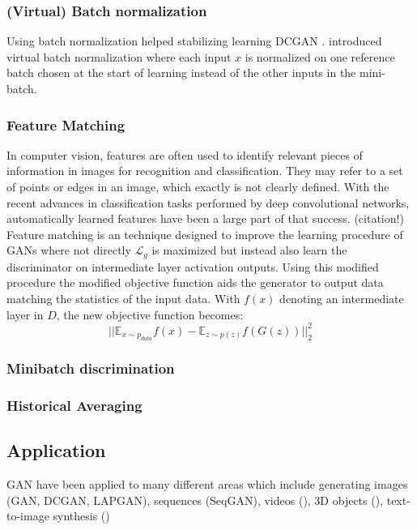 \subsubsection{(Virtual) Batch normalization}
\label{ssub:gan_batch_norm}
Using batch normalization \cite{batch_norm:2015} helped stabilizing learning DCGAN \cite{dcgan:2015}.
\cite{improved_gan:2016} introduced virtual batch normalization where each input $x$ is normalized on one reference batch chosen at the start of learning instead of the other inputs in the mini-batch.

\subsubsection{Feature Matching}
\label{ssub:gan_feature_matching}
In computer vision, features are often used to identify relevant pieces of information in images for recognition and classification.
They may refer to a set of points or edges in an image, which exactly is not clearly defined.
With the recent advances in classification tasks performed by deep convolutional networks, automatically learned features have been a large part of that success. (citation!)
Feature matching is an technique designed to improve the learning procedure of GANs where not directly $\mathcal{L}_g$ is maximized but instead also learn the discriminator on intermediate layer activation outputs.
Using this modified procedure the modified objective function aids the generator to output data matching the statistics of the input data.
With $f(x)$ denoting an intermediate layer in $D$, the new objective function becomes:
$$
|| \mathbb{E}_{x \sim p_{data}}f(x) - \mathbb{E}_{z \sim p(z)}f(G(z)) || ^{2}_{2}
$$


\subsubsection{Minibatch discrimination}
\label{ssub:gan_minibatch_discrimination}

\subsubsection{Historical Averaging}
\label{ssub:gan_historical_averaging}




\subsection{Application}
\label{sub:gan_application}
GAN have been applied to many different areas which include generating images (GAN, DCGAN, LAPGAN), sequences (SeqGAN), videos (\cite{gan_video:2016}), 3D objects (\cite{gan_3d:2016}), text-to-image synthesis (\cite{gan_t2i:2016})


